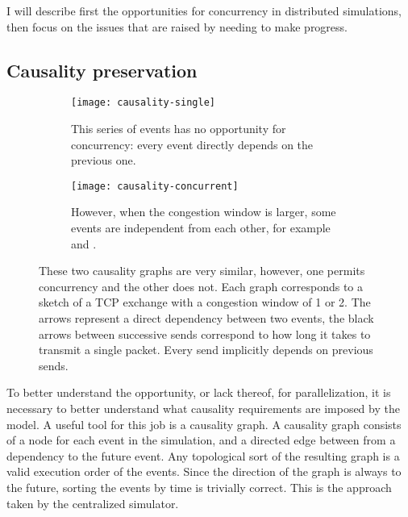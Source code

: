 I will describe first the opportunities for concurrency in distributed simulations, then focus on the issues that are raised by needing to make progress.

\subsection{Causality preservation} \label{causality}

\begin{figure}
    \centering
    \begin{subfigure}[t]{0.45\textwidth}
        \centering
        \texttt{[image: causality-single]}
        \caption{
            This series of events has no opportunity for concurrency: every event directly depends on the previous one.
        }
        \label{causality-graph-seq:fig}
    \end{subfigure}
    \begin{subfigure}[t]{0.45\textwidth}
        \centering
        \texttt{[image: causality-concurrent]}
        \caption{
            However, when the congestion window is larger, some events are independent from each other, for example  and .
        }
        \label{causality-graph-seq:fig}
    \end{subfigure}
    \caption{
        These two causality graphs are very similar, however, one permits concurrency and the other does not.
        Each graph corresponds to a sketch of a TCP exchange with a congestion window of 1 or 2.
        The arrows represent a direct dependency between two events, the black arrows between successive sends correspond to how long it takes to transmit a single packet.
        Every send implicitly depends on previous sends.
    }
    \label{causality-graph:fig}
\end{figure}

To better understand the opportunity, or lack thereof, for parallelization, it is necessary to better understand what causality requirements are imposed by the model.
A useful tool for this job is a causality graph.
A causality graph consists of a node for each event in the simulation, and a directed edge between from a dependency to the future event.
Any topological sort of the resulting graph is a valid execution order of the events.
Since the direction of the graph is always to the future, sorting the events by time is trivially correct.
This is the approach taken by the centralized simulator.

